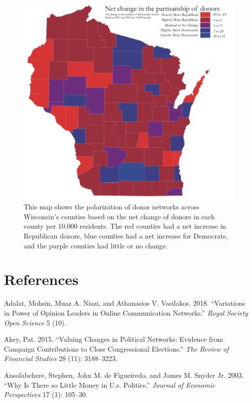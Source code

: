 \documentclass[12pt,]{article}
\begin{document}
\begin{figure}
\includegraphics[width=0.9\linewidth]{../figures/fig5} \caption{This map shows the polarization of donor networks across Wisconsin's counties based on the net change of donors in each county per 10,000 residents. The red counties had a net increase in Republican donors, blue counties had a net increase for Democrats, and the purple counties had little or no change.}\label{fig:unnamed-chunk-14}
\end{figure}

\newpage

\hypertarget{references}{%
\section*{References}\label{references}}

\hypertarget{refs}{}
\leavevmode\hypertarget{ref-adalat2018}{}%
Adalat, Mohsin, Muaz A. Niazi, and Athanasios V. Vasilakos. 2018.
``Variations in Power of Opinion Leaders in Online Communication
Networks.'' \emph{Royal Society Open Science} 5 (10).

\leavevmode\hypertarget{ref-akey2015}{}%
Akey, Pat. 2015. ``Valuing Changes in Political Networks: Evidence from
Campaign Contributions to Close Congressional Elections.'' \emph{The
Review of Financial Studies} 28 (11): 3188--3223.

\leavevmode\hypertarget{ref-ansolabehere2003}{}%
Ansolabehere, Stephen, John M. de Figueiredo, and James M. Snyder Jr.
2003. ``Why Is There so Little Money in U.s. Politics.'' \emph{Journal
of Economic Perspectives} 17 (1): 105--30.
\end{document}
